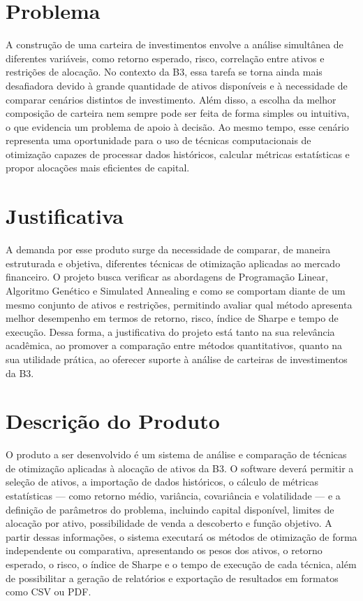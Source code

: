 \documentclass[
	12pt,				%
	openright,			%
	oneside,			    %
	a4paper,				%
	english,			%
	french,			%
	spanish,			%
	brazil			%
	]{abntex2}
\begin{document}
\section{Problema}

A construção de uma carteira de investimentos envolve a análise simultânea de diferentes variáveis, como retorno esperado, risco, correlação entre ativos e restrições de alocação. No contexto da B3, essa tarefa se torna ainda mais desafiadora devido à grande quantidade de ativos disponíveis e à necessidade de comparar cenários distintos de investimento. Além disso, a escolha da melhor composição de carteira nem sempre pode ser feita de forma simples ou intuitiva, o que evidencia um problema de apoio à decisão. Ao mesmo tempo, esse cenário representa uma oportunidade para o uso de técnicas computacionais de otimização capazes de processar dados históricos, calcular métricas estatísticas e propor alocações mais eficientes de capital.

\section{Justificativa}

A demanda por esse produto surge da necessidade de comparar, de maneira estruturada e objetiva, diferentes técnicas de otimização aplicadas ao mercado financeiro. O projeto busca verificar as abordagens de Programação Linear, Algoritmo Genético e Simulated Annealing e como se comportam diante de um mesmo conjunto de ativos e restrições, permitindo avaliar qual método apresenta melhor desempenho em termos de retorno, risco, índice de Sharpe e tempo de execução. Dessa forma, a justificativa do projeto está tanto na sua relevância acadêmica, ao promover a comparação entre métodos quantitativos, quanto na sua utilidade prática, ao oferecer suporte à análise de carteiras de investimentos da B3.

\section{Descrição do Produto}

O produto a ser desenvolvido é um sistema de análise e comparação de técnicas de otimização aplicadas à alocação de ativos da B3. O software deverá permitir a seleção de ativos, a importação de dados históricos, o cálculo de métricas estatísticas — como retorno médio, variância, covariância e volatilidade — e a definição de parâmetros do problema, incluindo capital disponível, limites de alocação por ativo, possibilidade de venda a descoberto e função objetivo. A partir dessas informações, o sistema executará os métodos de otimização de forma independente ou comparativa, apresentando os pesos dos ativos, o retorno esperado, o risco, o índice de Sharpe e o tempo de execução de cada técnica, além de possibilitar a geração de relatórios e exportação de resultados em formatos como CSV ou PDF.
\end{document}
